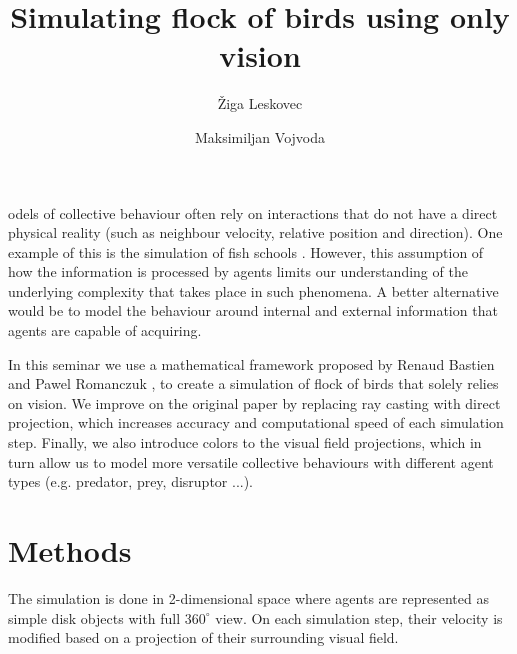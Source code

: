 \documentclass[9pt]{pnas-new}
\title{Simulating flock of birds using only vision}
\author{Žiga Leskovec}
\author{Maksimiljan Vojvoda}
\affil{Collective behaviour course research seminar report}
\begin{document}
\verticaladjustment{-2pt}

\maketitle
\thispagestyle{firststyle}

odels of collective behaviour often rely on interactions that do not have a direct physical reality (such as neighbour velocity, relative position and direction).
One example of this is the simulation of fish schools \cite{wissel1992fish}.
However, this assumption of how the information is processed by agents limits our understanding of the underlying complexity that takes place in such phenomena.
A better alternative would be to model the behaviour around internal and external information that agents are capable of acquiring.

In this seminar we use a mathematical framework proposed by Renaud Bastien and Pawel Romanczuk \cite{main-paper}, to create a simulation of flock of birds that solely relies on vision.
We improve on the original paper by replacing ray casting with direct projection, which increases accuracy and computational speed of each simulation step.
Finally, we also introduce colors to the visual field projections, which in turn allow us to model more versatile collective behaviours with different agent types (e.g. predator, prey, disruptor ...).

























\section*{Methods}

The simulation is done in 2-dimensional space where agents are represented as simple disk objects with full $360^\circ$ view.
On each simulation step, their velocity is modified based on a projection of their surrounding visual field.
\end{document}
